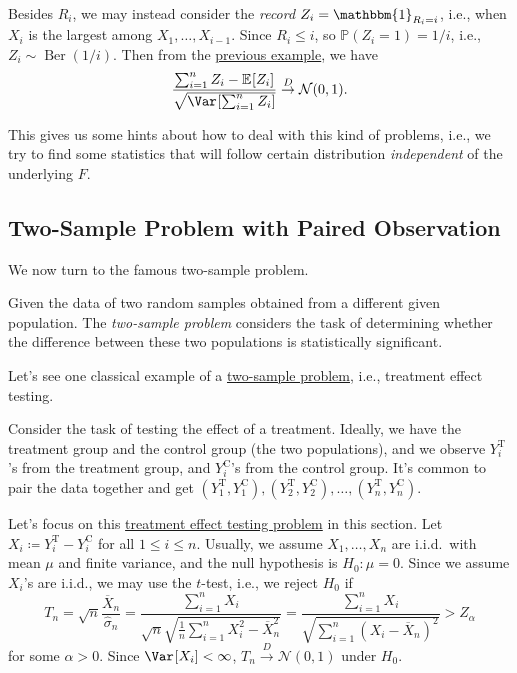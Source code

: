 \begin{remark}[Record]
	Besides \(R_i\), we may instead consider the \emph{record} \(Z_i = \mathbbm{1}_{R_i = i} \), i.e., when \(X_i\) is the largest among \(X_1, \dots , X_{i-1}\). Since \(R_i \leq i\), so \(\mathbb{P} (Z_i = 1) = 1 / i\), i.e., \(Z_i \sim \operatorname{Ber}(1 / i) \). Then from the \hyperref[eg:Lyapunov-CLT]{previous example}, we have
	\[
		\frac{\sum_{i=1}^{n} Z_i - \mathbb{E}_{}[Z_i] }{\sqrt{\Var_{}[\sum_{i=1}^{n} Z_i] } }
		\overset{D}{\to} \mathcal{N} (0, 1).
	\]
\end{remark}

This gives us some hints about how to deal with this kind of problems, i.e., we try to find some statistics that will follow certain distribution \emph{independent} of the underlying \(F\).

\subsection{Two-Sample Problem with Paired Observation}
We now turn to the famous two-sample problem.

\begin{problem}\label{prb:two-sample}
Given the data of two random samples obtained from a different given population. The \emph{two-sample problem} considers the task of determining whether the difference between these two populations is statistically significant.
\end{problem}

Let's see one classical example of a \hyperref[prb:two-sample]{two-sample problem}, i.e., treatment effect testing.

\begin{eg}\label{eg:treatment-effect}
	Consider the task of testing the effect of a treatment. Ideally, we have the treatment group and the control group (the two populations), and we observe \(Y_i^{\text{T} }\)'s from the treatment group, and \(Y_i^{\text{C} }\)'s from the control group. It's common to pair the data together and get \((Y_1^{\text{T} }, Y_1^{\text{C} }), (Y_2^{\text{T} }, Y_2^{\text{C} }), \dots , (Y_n^{\text{T} }, Y_n^{\text{C} })\).
\end{eg}

Let's focus on this \hyperref[eg:treatment-effect]{treatment effect testing problem} in this section. Let \(X_i \coloneqq Y_i^{\text{T} } - Y_i^{\text{C} }\) for all \(1 \leq i \leq n\). Usually, we assume \(X_1 , \dots , X_n\) are i.i.d.\ with mean \(\mu \) and finite variance, and the null hypothesis is \(H_0 \colon \mu = 0\). Since we assume \(X_i\)'s are i.i.d., we may use the \(t\)-test, i.e., we reject \(H_0\) if
\[
	T_n
	= \sqrt{n} \frac{\overline{X} _n}{\hat{\sigma} _n}
	= \frac{\sum_{i=1}^{n} X_i}{\sqrt{n} \sqrt{\frac{1}{n} \sum_{i=1}^{n} X_i^2 - \overline{X} _n^2} }
	= \frac{\sum_{i=1}^{n} X_i}{\sqrt{\sum_{i=1}^{n} (X_i - \overline{X} _n)^2} }
	> Z_{\alpha }
\]
for some \(\alpha > 0\). Since \(\Var_{}[X_i] < \infty \), \(T_n \overset{D}{\to} \mathcal{N} (0, 1)\) under \(H_0\).

